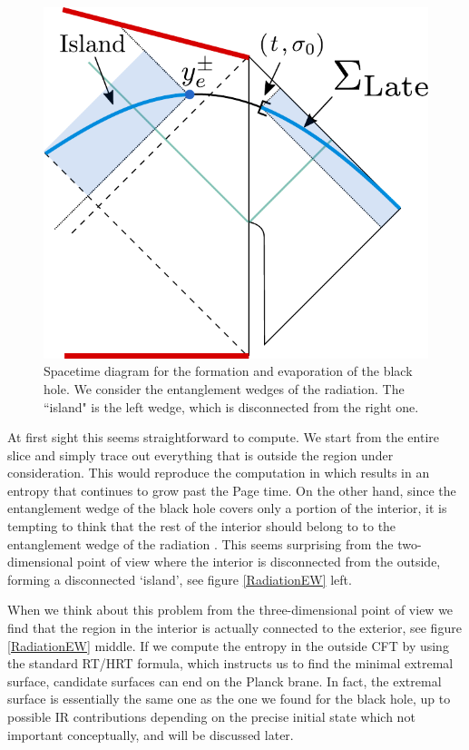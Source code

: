 \documentclass[12pt]{article}
\begin{document}
\begin{figure}[ht]
    \begin{center}
    \includegraphics[scale=.5]{Figures/latetimeslicerad}
    \end{center}
    \caption{ Spacetime diagram for the formation and evaporation of the black hole. We consider the entanglement wedges of the radiation. The ``island" is the left wedge, which is disconnected from the right one. }
    \label{latetimeslicerad}
\end{figure}

At first sight this seems straightforward to compute. 
We start from the entire slice and simply trace out everything that is outside the region under consideration. 
This would reproduce the computation in \cite{Hawking:1976ra} which results in an entropy that continues to grow past the Page time.
On the other hand, since the entanglement wedge of the black hole covers only a portion of the interior, it is tempting to think that the rest of the interior should belong to to the entanglement wedge of the radiation \cite{Penington:2019npb, Almheiri:2019psf,Hayden:2018khn}. 
This seems surprising from the two-dimensional point of view where the interior is disconnected from the outside, forming a disconnected  `island', see figure \ref{RadiationEW} left. 
  
When we think about this problem from the three-dimensional point of view we find that the region in the interior is actually connected to the exterior, see figure \ref{RadiationEW} middle. 
If we compute the entropy in the outside CFT by using the standard RT/HRT formula, which instructs us to find the minimal extremal surface, candidate surfaces can end on the Planck brane.
In fact, the extremal surface is essentially the same one as the one we found for the black hole, up to possible IR contributions depending on the precise initial state which not important conceptually, and will be discussed later.
  
\end{document}

